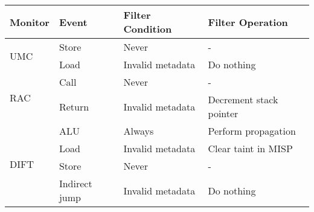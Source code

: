 
\begin{tabular}{|l|l||l|l|}
\hline

{\bf Monitor} & {\bf Event} & {\bf Filter Condition} & {\bf Filter Operation} \\ \hline \hline

\multirow{2}{*}{UMC}  
& Store & Never & - \\ \cline{2-4}
& Load & Invalid metadata & Do nothing \\ 
\hline\hline

\multirow{2}{*}{RAC}  
& Call & Never & - \\ \cline{2-4}
& Return & Invalid metadata & Decrement stack pointer \\ 
\hline\hline

\multirow{4}{*}{DIFT}  
& ALU & Always & Perform propagation \\ \cline{2-4}
& Load & Invalid metadata & Clear taint in MISP \\ \cline{2-4}
& Store & Never & - \\ \cline{2-4}
& Indirect jump & Invalid metadata & Do nothing \\ \hline

\end{tabular}

